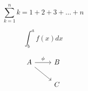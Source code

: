 \documentclass[10pt]{book}
\begin{document}
\begin{mdSnippets}
\newcommand{\downsetlattice}[1]{\mathcal{O}(#1)}
\newcommand{\downX}[1]{\downarrow #1}
\newcommand{\powerset}[1]{\mathbb{P}(#1)}
\newcommand{\dual}[1]{{#1^{\mathrm{op}}}}
\newcommand{\defset}[2]{\{#1 \mid #2\}}
\newcommand{\maxel}{\mathrm{Max}}
\newcommand{\minel}{\mathrm{Min}}

\begin{mdDisplaySnippet}[e6737fe01ca60e815989761af7761af5]%
\[%
\sum_{k=1}^{n} k = 1 + 2 + 3 + \dots + n
\]%
\end{mdDisplaySnippet}%
\begin{mdDisplaySnippet}[31e1b3b7a6a0bb57c1d0ef06eae0097a]%
\[%
\int _ {b}^{a} f(x) dx
\]%
\end{mdDisplaySnippet}%
\begin{mdDisplaySnippet}[6c9ae8c44a18375dc3b6057025c5118c]%
\[%
 \begin{tikzcd}A \arrow{rd} \arrow{r}{\phi} & B \\ & C\end{tikzcd}
\]%
\end{mdDisplaySnippet}%

\end{mdSnippets}
\end{document}
